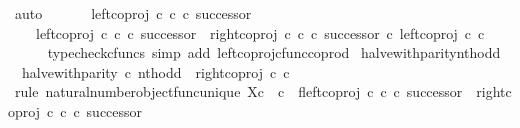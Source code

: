\begin{isabellebody}
\ auto\isanewline
\ \ \isamarkupfalse%
\isanewline
\isanewline
\ \ \isamarkupfalse%
\ {\isachardoublequoteopen}left{\isacharunderscore}{\kern0pt}coproj\ {\isasymnat}\isactrlsub c\ {\isasymnat}\isactrlsub c\ {\isasymcirc}\isactrlsub c\ successor\ {\isacharequal}{\kern0pt}\isanewline
\ \ \ \ {\isacharparenleft}{\kern0pt}left{\isacharunderscore}{\kern0pt}coproj\ {\isasymnat}\isactrlsub c\ {\isasymnat}\isactrlsub c\ {\isasymcirc}\isactrlsub c\ successor{\isacharparenright}{\kern0pt}\ {\isasymamalg}\ {\isacharparenleft}{\kern0pt}right{\isacharunderscore}{\kern0pt}coproj\ {\isasymnat}\isactrlsub c\ {\isasymnat}\isactrlsub c\ {\isasymcirc}\isactrlsub c\ successor{\isacharparenright}{\kern0pt}\ {\isasymcirc}\isactrlsub c\ left{\isacharunderscore}{\kern0pt}coproj\ {\isasymnat}\isactrlsub c\ {\isasymnat}\isactrlsub c{\isachardoublequoteclose}\isanewline
\ \ \ \ \isamarkupfalse%
\ {\isacharparenleft}{\kern0pt}typecheck{\isacharunderscore}{\kern0pt}cfuncs{\isacharcomma}{\kern0pt}\ simp\ add{\isacharcolon}{\kern0pt}\ left{\isacharunderscore}{\kern0pt}coproj{\isacharunderscore}{\kern0pt}cfunc{\isacharunderscore}{\kern0pt}coprod{\isacharparenright}{\kern0pt}\isanewline
{}\isamarkupfalse%
%
\endisatagproof
{\isafoldproof}%
%
\isadelimproof
\isanewline
%
\endisadelimproof
\isanewline
{}\isamarkupfalse%
\ halve{\isacharunderscore}{\kern0pt}with{\isacharunderscore}{\kern0pt}parity{\isacharunderscore}{\kern0pt}nth{\isacharunderscore}{\kern0pt}odd{\isacharcolon}{\kern0pt}\isanewline
\ \ {\isachardoublequoteopen}halve{\isacharunderscore}{\kern0pt}with{\isacharunderscore}{\kern0pt}parity\ {\isasymcirc}\isactrlsub c\ nth{\isacharunderscore}{\kern0pt}odd\ {\isacharequal}{\kern0pt}\ right{\isacharunderscore}{\kern0pt}coproj\ {\isasymnat}\isactrlsub c\ {\isasymnat}\isactrlsub c{\isachardoublequoteclose}\isanewline
%
\isadelimproof
%
\endisadelimproof
%
\isatagproof
{}\isamarkupfalse%
\ {\isacharparenleft}{\kern0pt}rule\ natural{\isacharunderscore}{\kern0pt}number{\isacharunderscore}{\kern0pt}object{\isacharunderscore}{\kern0pt}func{\isacharunderscore}{\kern0pt}unique{\isacharbrackleft}{\kern0pt}\ X{\isacharequal}{\kern0pt}{\isachardoublequoteopen}{\isasymnat}\isactrlsub c\ {\isasymCoprod}\ {\isasymnat}\isactrlsub c{\isachardoublequoteclose}{\isacharcomma}{\kern0pt}\ \ f{\isacharequal}{\kern0pt}{\isachardoublequoteopen}{\isacharparenleft}{\kern0pt}left{\isacharunderscore}{\kern0pt}coproj\ {\isasymnat}\isactrlsub c\ {\isasymnat}\isactrlsub c\ {\isasymcirc}\isactrlsub c\ successor{\isacharparenright}{\kern0pt}\ {\isasymamalg}\ {\isacharparenleft}{\kern0pt}right{\isacharunderscore}{\kern0pt}coproj\ {\isasymnat}\isactrlsub c\ {\isasymnat}\isactrlsub c\ {\isasymcirc}\isactrlsub c\ successor{\isacharparenright}{\kern0pt}{\isachardoublequoteclose}{\isacharbrackright}{\kern0pt}{\isacharparenright}{\kern0pt}\isanewline

\end{isabellebody}
